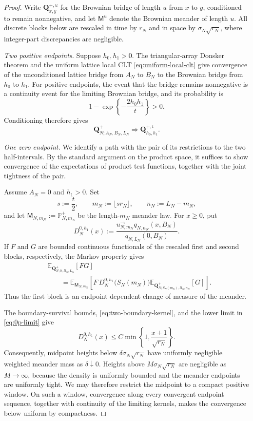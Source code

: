 \documentclass[11pt]{article}
\theoremstyle{plain}
\theoremstyle{definition}
\theoremstyle{remark}
\newcommand{\Pp}{\mathbb P}
\newcommand{\Ee}{\mathbb E}
\begin{document}
\begin{proof}
Write \(\mathbf Q_{x,y}^{+,u}\) for the Brownian bridge of length
\(u\) from \(x\) to \(y\), conditioned to remain nonnegative, and let
\(\mathsf M^u\) denote the Brownian meander of length \(u\).
All discrete blocks below are rescaled in time by \(r_N\) and in space
by \(\sigma_N\sqrt{r_N}\), where integer-part discrepancies are negligible.


\smallskip
\noindent
\emph{Two positive endpoints.}
Suppose \(h_0,h_1>0\).  The triangular-array Donsker theorem and the
uniform lattice local CLT \eqref{eq:uniform-local-clt} give
convergence of the unconditioned lattice
bridge from \(A_N\) to \(B_N\) to the Brownian bridge from \(h_0\) to
\(h_1\).  
For positive endpoints, the event that the bridge remains nonnegative
is a continuity event for the limiting Brownian bridge, and its
probability is
\[
 1-\exp\left\{-\frac{2h_0h_1}{t}\right\}>0.
\]
Conditioning therefore gives
\[
 \mathbf Q_{N;A_N,B_N,L_N}^{+}
 \Longrightarrow
 \mathbf Q_{h_0,h_1}^{+,t}.
\]

\smallskip
\noindent
\emph{One zero endpoint.}
We identify a path with the pair of its restrictions to the two
half-intervals.  By the standard argument on the product space, it suffices to show convergence of
the expectations of product test functions, together with the joint tightness of the pair.  

Assume \(A_N=0\) and \(h_1>0\).  Set
\[
 s:=\frac t2,\qquad
 m_N:=\lfloor sr_N\rfloor,\qquad
 n_N:=L_N-m_N,
\]
and let \(\mathsf M_{N,m_N}:=\Pp_{N,m_N}^{+}\) be the length-\(m_N\)
meander law.  For \(x\ge0\), put
\[
 D_N^{0,h_1}(x)
 :=
 \frac{
   u_{N,m_N}^{\rightarrow}q_{N,n_N}(x,B_N)
 }{
   q_{N,L_N}(0,B_N)
 }.
\]
If \(F\) and \(G\) are bounded continuous functionals of the rescaled
first and second blocks, respectively, the Markov property gives
\[
\begin{aligned}
 &\Ee_{\mathbf Q_{N;0,B_N,L_N}^{+}}[FG] \\
 &\qquad =
 \Ee_{\mathsf M_{N,m_N}}
 \left[
   F\,D_N^{0,h_1}\bigl(S_N(m_N)\bigr)
   \Ee_{\mathbf Q_{N;S_N(m_N),B_N,n_N}^{+}}[G]
 \right].
\end{aligned}
\]
Thus the first block is an endpoint-dependent change of measure of the
meander.

The boundary-survival bounds, \eqref{eq:two-boundary-kernel}, and the
lower limit in \eqref{eq:0p-limit} give
\[
 D_N^{0,h_1}(x)
 \le
 C\min\left\{1,\frac{x+1}{\sqrt{r_N}}\right\}.
\]
Consequently, midpoint heights below
\(\delta\sigma_N\sqrt{r_N}\) have uniformly negligible weighted
meander mass as \(\delta\downarrow0\).  Heights above
\(M\sigma_N\sqrt{r_N}\) are negligible as \(M\to\infty\), because the
density is uniformly bounded and the meander endpoints are uniformly
tight. We may therefore restrict the midpoint to a compact positive
window.  On such a window, convergence along every convergent endpoint
sequence, together with continuity of the limiting kernels, makes the
convergence below uniform by compactness.


\end{proof}
\end{document}
